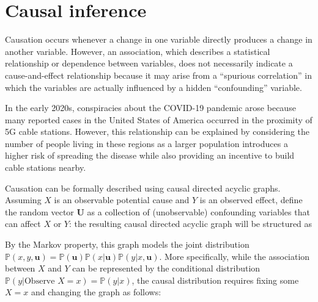 \documentclass{report}
\begin{document}
\section{Causal inference}
Causation occurs whenever a change in one variable directly produces a change in another variable. \newline
However, an association, which describes a statistical relationship or dependence between variables, does not necessarily indicate a cause-and-effect relationship because it may arise from a ``spurious correlation'' in which the variables are actually influenced by a hidden ``confounding'' variable.
\begin{examplebox}
    In the early 2020s, conspiracies about the COVID-19 pandemic arose because many reported cases in the United States of America occurred in the proximity of 5G cable stations. \newline
    However, this relationship can be explained by considering the number of people living in these regions as a larger population introduces a higher risk of spreading the disease while also providing an incentive to build cable stations nearby.
\end{examplebox}
\noindent Causation can be formally described using causal directed acyclic graphs. \newline
Assuming $\displaystyle X$ is an observable potential cause and $\displaystyle Y$ is an observed effect, define the random vector $\displaystyle \mathbf{U}$ as a collection of (unobservable) confounding variables that can affect $\displaystyle X$ or $\displaystyle Y$: the resulting causal directed acyclic graph will be structured as


\noindent By the Markov property, this graph models the joint distribution $\displaystyle \mathbb{P}(x, y, \mathbf{u}) = \mathbb{P}(\mathbf{u})\mathbb{P}(x|\mathbf{u})\mathbb{P}(y|x, \mathbf{u})$. \newline
More specifically, while the association between $\displaystyle X$ and $\displaystyle Y$ can be represented by the conditional distribution $\displaystyle \mathbb{P}(y|\text{Observe } X = x) =  \mathbb{P}(y|x)$, the causal distribution requires fixing some $\displaystyle X = x$ and changing the graph as follows:
\end{document}
